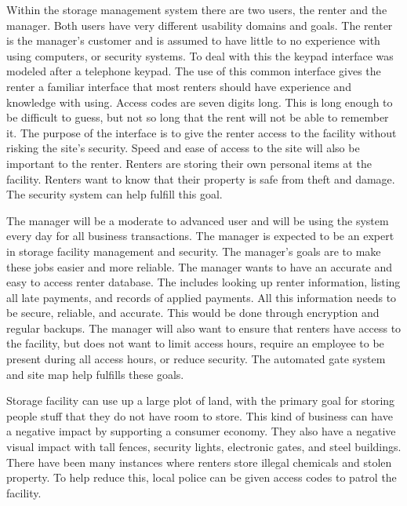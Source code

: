 \documentclass[a4paper,12pt]{report}
\begin{document}
Within the storage management system there are two users, the renter and the manager.  Both users have very different usability domains and goals.  The renter is the manager's customer and is assumed to have little to no experience with using computers, or security systems.  To deal with this the keypad interface was modeled after a telephone keypad.  The use of this common interface gives the renter a familiar interface that most renters should have experience and knowledge with using.  Access codes are seven digits long.  This is long enough to be difficult to guess, but not so long that the rent will not be able to remember it.  The purpose of the interface is to give the renter access to the facility without risking the site's security.  Speed and ease of access to the site will also be important to the renter.   Renters are storing their own personal items at the facility.  Renters want to know that their property is safe from theft and damage.  The security system can help fulfill this goal.

The manager will be a moderate to advanced user and will be using the system every day for all business transactions.  The manager is expected to be an expert in storage facility management and security.  The manager's goals are to make these jobs easier and more reliable.  The manager wants to have an accurate and easy to access renter database.  The includes looking up renter information, listing all late payments, and records of applied payments.  All this information needs to be secure, reliable, and accurate.  This would be done through encryption and regular backups.  The manager will also want to ensure that renters have access to the facility, but does not want to limit access hours, require an employee to be present during all access hours, or reduce security.  The automated gate system and site map help fulfills these goals.  

Storage facility can use up a large plot of land, with the primary goal for storing people stuff that they do not have room to store.  This kind of business can have a negative impact by supporting a consumer economy.  They also have a negative visual impact with tall fences, security lights, electronic gates, and steel buildings.  There have been many instances where renters store illegal chemicals and stolen property.  To help reduce this, local police can be given access codes to patrol the facility.  
\end{document}
